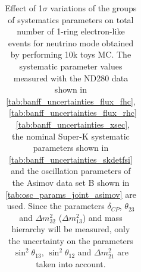 \begin{table}[htb]
\begin{tabular}{| c | c | c |}
\end{tabular}
\caption{
 Effect of 1$\sigma$ variations of the groups of systematics parameters on total number of
 1-ring electron-like events for neutrino mode obtained by performing 10k toys MC.
The systematic parameter values measured with the ND280 data 
shown in 
\cref{tab:banff_uncertainties_flux_fhc},
~\ref{tab:banff_uncertainties_flux_rhc}
~\ref{tab:banff_uncertainties_xsec},
the nominal Super-K systematic parameters shown in \cref{tab:banff_uncertainties_skdetfsi}
and the oscillation parameters of the Asimov data set B shown in \cref{tab:osc_params_joint_asimov}
are used.
Since the parameters $\delta_{CP}$, $\theta_{23}$ and $\Delta m^2_{32}$ ($\Delta m^2_{13}$) and mass hierarchy
will be measured,
only the uncertainty on the parameters 
$\sin^2 \theta_{13}$,
$\sin^2 \theta_{12}$
and 
$\Delta m^2_{21}$ 
are taken into account.
}                                                                                                                                                                                          
\label{tab:nsk_systematic_table_summary_joint_asimov_B_fhc_elike_Run17b}
\end{table}





